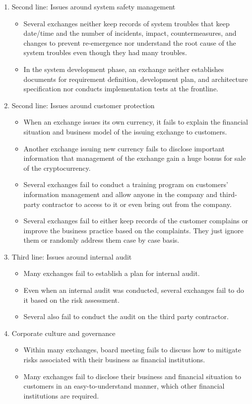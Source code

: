 \begin{enumerate}
  \item Second line: Issues around system safety management
  \begin{itemize}
    \item Several exchanges neither keep records of system troubles that keep date/time and the number of incidents, impact, countermeasures, and changes to prevent re-emergence nor understand the root cause of the system troubles even though they had many troubles.
    \item In the system development phase, an exchange neither establishes documents for requirement definition, development plan, and architecture specification nor conducts implementation tests at the frontline.
  \end{itemize}

  \item Second line: Issues around customer protection
  \begin{itemize}
    \item When an exchange issues its own currency, it fails to explain the financial situation and business model of the issuing exchange to customers.
    \item Another exchange issuing new currency fails to disclose important information that management of the exchange gain a huge bonus for sale of the cryptocurrency.
    \item Several exchanges fail to conduct a training program on customers' information management and allow anyone in the company and third-party contractor to access to it or even bring out from the company.
    \item Several exchanges fail to either keep records of the customer complains or improve the business practice based on the complaints. They just ignore them or randomly address them case by case basis.
  \end{itemize}

  \item Third line: Issues around internal audit
  \begin{itemize}
    \item Many exchanges fail to establish a plan for internal audit.
    \item Even when an internal audit was conducted, several exchanges fail to do it based on the risk assessment.
    \item Several also fail to conduct the audit on the third party contractor.
  \end{itemize}

  \item Corporate culture and governance
  \begin{itemize}
    \item Within many exchanges, board meeting fails to discuss how to mitigate risks associated with their business as financial institutions.
    \item Many exchanges fail to disclose their business and financial situation to customers in an easy-to-understand manner, which other financial institutions are required.
  \end{itemize}

\end{enumerate}
